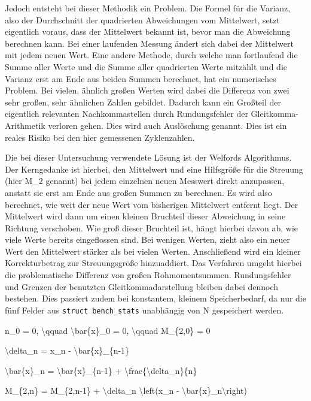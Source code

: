 Jedoch entsteht bei dieser Methodik ein Problem. Die Formel f{\"u}r die Varianz, also der Durchschnitt der quadrierten Abweichungen vom Mittelwert, setzt eigentlich voraus, dass der Mittelwert bekannt ist, bevor man die Abweichung berechnen kann. Bei einer laufenden Messung {\"a}ndert sich dabei der Mittelwert mit jedem neuen Wert. Eine andere Methode, durch welche man fortlaufend die Summe aller Werte und die Summe aller quadrierten Werte mitz{\"a}hlt und die Varianz erst am Ende aus beiden Summen berechnet, hat ein numerisches Problem. Bei vielen, {\"a}hnlich gro{\ss}en Werten wird dabei die Differenz von zwei sehr gro{\ss}en, sehr {\"a}hnlichen Zahlen gebildet. Dadurch kann ein Gro{\ss}teil der eigentlich relevanten Nachkommastellen durch Rundungsfehler der Gleitkomma-Arithmetik verloren gehen. Dies wird auch \glqq{}Ausl{\"o}schung\grqq{} genannt. Dies ist ein reales Risiko bei den hier gemessenen Zyklenzahlen.

Die bei dieser Untersuchung verwendete L{\"o}sung ist der Welfords Algorithmus. Der Kerngedanke ist hierbei, den Mittelwert und eine Hilfsgr{\"o}{\ss}e f{\"u}r die Streuung (hier M\_2 genannt) bei jedem einzelnen neuen Messwert direkt anzupassen, anstatt sie erst am Ende aus gro{\ss}en Summen zu berechnen. Es wird also berechnet, wie weit der neue Wert vom bisherigen Mittelwert entfernt liegt. Der Mittelwert wird dann um einen kleinen Bruchteil dieser Abweichung in seine Richtung verschoben. Wie gro{\ss} dieser Bruchteil ist, h{\"a}ngt hierbei davon ab, wie viele Werte bereits eingeflossen sind. Bei wenigen Werten, zieht also ein neuer Wert den Mittelwert st{\"a}rker als bei vielen Werten. Anschlie{\ss}end wird ein kleiner Korrekturbetrag zur Streuungsgr{\"o}{\ss}e hinzuaddiert. Das Verfahren umgeht hierbei die problematische Differenz von gro{\ss}en Rohmomentsummen. Rundungsfehler und Grenzen der benutzten Gleitkommadarstellung bleiben dabei dennoch bestehen. Dies passiert zudem bei konstantem, kleinem Speicherbedarf, da nur die f{\"u}nf Felder aus \lstinline[style=codeinline]|struct bench_stats| unabh{\"a}ngig von N gespeichert werden.

n\_0 = 0, \textbackslash{}qquad \textbackslash{}bar\{x\}\_0 = 0, \textbackslash{}qquad M\_\{2,0\} = 0

\textbackslash{}delta\_n = x\_n - \textbackslash{}bar\{x\}\_\{n-1\}

\textbackslash{}bar\{x\}\_n = \textbackslash{}bar\{x\}\_\{n-1\} + \textbackslash{}frac\{\textbackslash{}delta\_n\}\{n\}

M\_\{2,n\} = M\_\{2,n-1\} + \textbackslash{}delta\_n \textbackslash{}left(x\_n - \textbackslash{}bar\{x\}\_n\textbackslash{}right)

